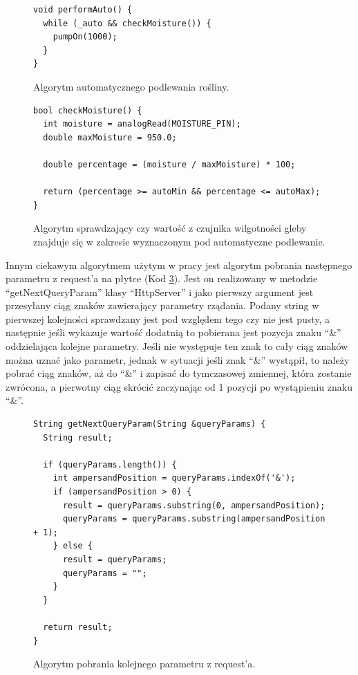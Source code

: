 \documentclass[a4paper,twoside,12pt]{book}
\begin{document}
\begin{figure}[H]
   \centering
   \footnotesize
   \begin{lstlisting}
void performAuto() {
  while (_auto && checkMoisture()) {
    pumpOn(1000);
  }
}
   \end{lstlisting}
   \caption{Algorytm automatycznego podlewania rośliny.}
   \label{code:6}
\end{figure}

\begin{figure}[H]
   \centering
   \footnotesize
   \begin{lstlisting}
bool checkMoisture() {
  int moisture = analogRead(MOISTURE_PIN);
  double maxMoisture = 950.0;

  double percentage = (moisture / maxMoisture) * 100;

  return (percentage >= autoMin && percentage <= autoMax);
}
   \end{lstlisting}
   \caption{Algorytm sprawdzający czy wartość z czujnika wilgotności gleby znajduje się w zakresie wyznaczonym pod automatyczne podlewanie.}
   \label{code:7}
\end{figure}

Innym ciekawym algorytmem użytym w pracy jest algorytm pobrania następnego parametru z request'a na płytce (Kod \ref{code:8}). Jest on realizowany w metodzie ``getNextQueryParam'' klasy ``HttpServer'' i jako pierwszy argument jest przesyłany ciąg znaków zawierający parametry rządania. Podany string w pierwszej kolejności sprawdzany jest pod względem tego czy nie jest pusty, a następnie jeśli wykazuje wartość dodatnią to pobierana jest pozycja znaku ``\&'' oddzielająca kolejne parametry. Jeśli nie występuje ten znak to cały ciąg znaków można uznać jako parametr, jednak w sytuacji jeśli znak ``\&'' wystąpił, to należy pobrać ciąg znaków, aż do ``\&'' i zapisać do tymczasowej zmiennej, która zostanie zwrócona, a pierwotny ciąg skrócić zaczynając od 1 pozycji po wystąpieniu znaku ``\&''.

\begin{figure}[H]
   \centering
   \footnotesize
   \begin{lstlisting}
String getNextQueryParam(String &queryParams) {
  String result;

  if (queryParams.length()) {
    int ampersandPosition = queryParams.indexOf('&');
    if (ampersandPosition > 0) {
      result = queryParams.substring(0, ampersandPosition);
      queryParams = queryParams.substring(ampersandPosition + 1);
    } else {
      result = queryParams;
      queryParams = "";
    }
  }

  return result;
}
   \end{lstlisting}
   \caption{Algorytm pobrania kolejnego parametru z request'a.}
   \label{code:8}
\end{figure}
\end{document}
